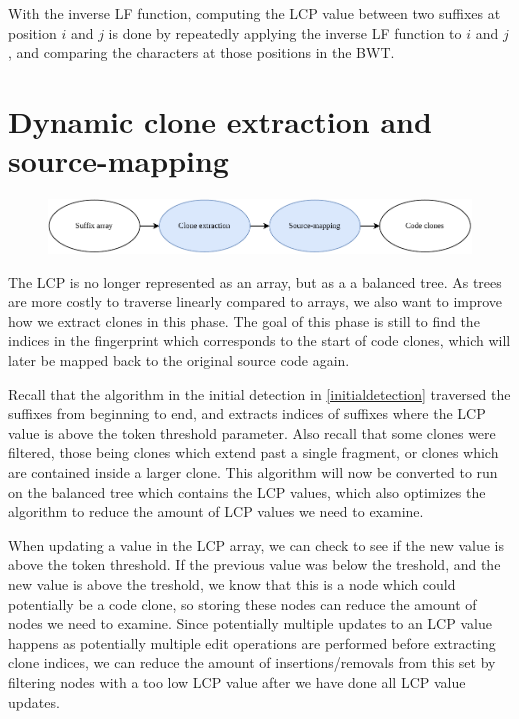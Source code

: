 With the inverse LF function, computing the LCP value between two suffixes at position $i$
and $j$ is done by repeatedly applying the inverse LF function to $i$ and $j$, and
comparing the characters at those positions in the BWT.



\section{Dynamic clone extraction and source-mapping}


\begin{figure}[H]
    \begin{center}
        \includegraphics[width=1\textwidth]{figures/phases/phases_extractionandsourcemap.drawio.pdf}
    \end{center}
\end{figure}

The LCP is no longer represented as an array, but as a a balanced tree. As trees are more
costly to traverse linearly compared to arrays, we also want to improve how we extract
clones in this phase. The goal of this phase is still to find the indices in the
fingerprint which corresponds to the start of code clones, which will later be mapped back
to the original source code again.

Recall that the algorithm in the initial detection in \cref{initialdetection} traversed
the suffixes from beginning to end, and extracts indices of suffixes where the LCP value
is above the token threshold parameter. Also recall that some clones were filtered, those
being clones which extend past a single fragment, or clones which are contained inside a
larger clone. This algorithm will now be converted to run on the balanced tree which
contains the LCP values, which also optimizes the algorithm to reduce the amount of LCP
values we need to examine.

When updating a value in the LCP array, we can check to see if the new value is above the
token threshold. If the previous value was below the treshold, and the new value is above
the treshold, we know that this is a node which could potentially be a code clone, so
storing these nodes can reduce the amount of nodes we need to examine. Since potentially
multiple updates to an LCP value happens as potentially multiple edit operations are
performed before extracting clone indices, we can reduce the amount of insertions/removals
from this set by filtering nodes with a too low LCP value after we have done all LCP value
updates.

